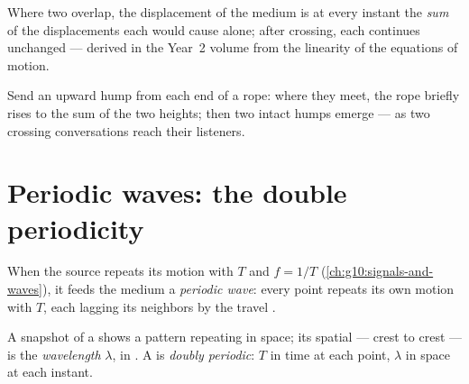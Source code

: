 \begin{proposition}\label{prop:g12:mechanical-waves:superposition}
Where two  overlap, the displacement of the medium is at every
instant the \emph{sum} of the displacements each would cause alone;
after crossing, each  continues unchanged --- derived in the
Year~2 volume from the linearity of the equations of motion. \admitted
\end{proposition}

\begin{example}\label{ex:g12:mechanical-waves:crossing}
Send an upward hump from each end of a rope: where they meet, the
rope briefly rises to the sum of the two heights; then two intact
humps emerge --- as two crossing conversations reach their listeners.
\end{example}

\section{Periodic waves: the double periodicity}

\begin{definition}\label{def:g12:mechanical-waves:periodic}
When the source repeats its motion with  $T$ and 
$f = 1/T$ (\cref{ch:g10:signals-and-waves}), it feeds the medium a
\emph{periodic wave}: every point repeats its own
motion with  $T$, each lagging its neighbors by the travel .
\end{definition}

\begin{definition}[Wavelength]\label{def:g12:mechanical-waves:wavelength}
A snapshot of a  shows a pattern repeating in space; its
spatial  --- crest to crest --- is the
\emph{wavelength} $\lambda$, in . A  is \emph{doubly periodic}:  $T$
in time at each point,  $\lambda$ in space at each instant.
\end{definition}


